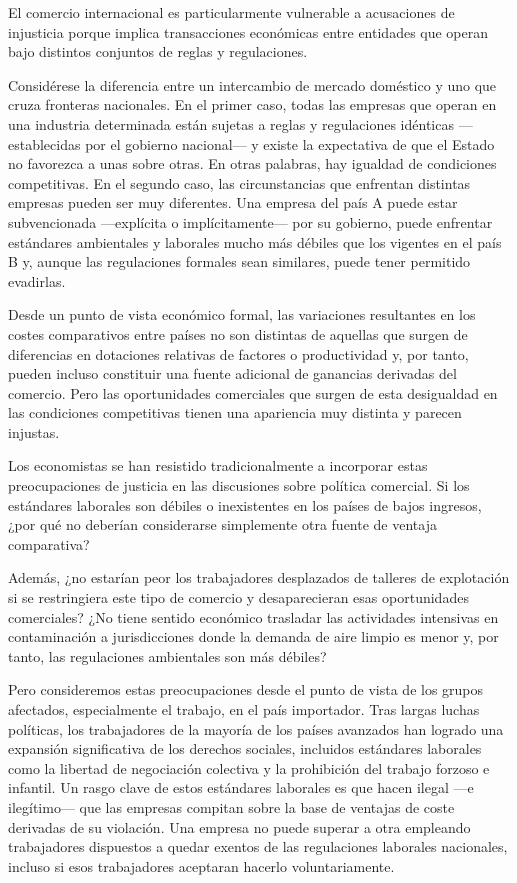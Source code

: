 \documentclass[10pt,a4paper]{article}
\begin{document}
El comercio internacional es particularmente vulnerable a acusaciones de injusticia porque implica transacciones económicas entre entidades que operan bajo distintos conjuntos de reglas y regulaciones.

Considérese la diferencia entre un intercambio de mercado doméstico y uno que cruza fronteras nacionales. En el primer caso, todas las empresas que operan en una industria determinada están sujetas a reglas y regulaciones idénticas —establecidas por el gobierno nacional— y existe la expectativa de que el Estado no favorezca a unas sobre otras. En otras palabras, hay igualdad de condiciones competitivas. En el segundo caso, las circunstancias que enfrentan distintas empresas pueden ser muy diferentes. Una empresa del país A puede estar subvencionada —explícita o implícitamente— por su gobierno, puede enfrentar estándares ambientales y laborales mucho más débiles que los vigentes en el país B y, aunque las regulaciones formales sean similares, puede tener permitido evadirlas.

Desde un punto de vista económico formal, las variaciones resultantes en los costes comparativos entre países no son distintas de aquellas que surgen de diferencias en dotaciones relativas de factores o productividad y, por tanto, pueden incluso constituir una fuente adicional de ganancias derivadas del comercio. Pero las oportunidades comerciales que surgen de esta desigualdad en las condiciones competitivas tienen una apariencia muy distinta y parecen injustas.

Los economistas se han resistido tradicionalmente a incorporar estas preocupaciones de justicia en las discusiones sobre política comercial. Si los estándares laborales son débiles o inexistentes en los países de bajos ingresos, ¿por qué no deberían considerarse simplemente otra fuente de ventaja comparativa?

Además, ¿no estarían peor los trabajadores desplazados de talleres de explotación si se restringiera este tipo de comercio y desaparecieran esas oportunidades comerciales? ¿No tiene sentido económico trasladar las actividades intensivas en contaminación a jurisdicciones donde la demanda de aire limpio es menor y, por tanto, las regulaciones ambientales son más débiles?

Pero consideremos estas preocupaciones desde el punto de vista de los grupos afectados, especialmente el trabajo, en el país importador. Tras largas luchas políticas, los trabajadores de la mayoría de los países avanzados han logrado una expansión significativa de los derechos sociales, incluidos estándares laborales como la libertad de negociación colectiva y la prohibición del trabajo forzoso e infantil. Un rasgo clave de estos estándares laborales es que hacen ilegal —e ilegítimo— que las empresas compitan sobre la base de ventajas de coste derivadas de su violación. Una empresa no puede superar a otra empleando trabajadores dispuestos a quedar exentos de las regulaciones laborales nacionales, incluso si esos trabajadores aceptaran hacerlo voluntariamente.
\end{document}
